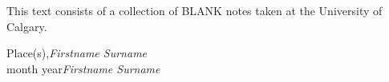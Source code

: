 %
%

\preface

This text consists of a collection of BLANK notes taken at the University of Calgary.
 

\vspace{\baselineskip}
\begin{flushright}\noindent
Place(s),\hfill {\it Firstname  Surname}\\
month year\hfill {\it Firstname  Surname}\\
\end{flushright}


